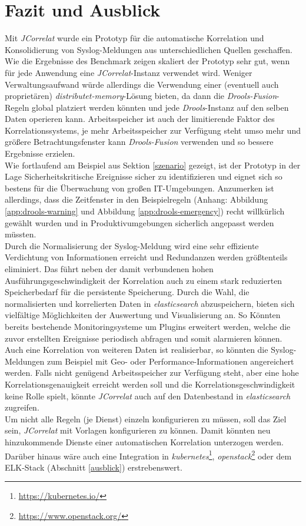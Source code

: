 \chapter{Fazit und Ausblick}
\thispagestyle{fancy}

Mit \textit{JCorrelat} wurde ein Prototyp für die automatische Korrelation und 
Konsolidierung von Syslog-Meldungen aus unterschiedlichen Quellen geschaffen. Wie die 
Ergebnisse des Benchmark zeigen skaliert der Prototyp sehr gut, wenn für jede Anwendung 
eine \textit{JCorrelat}-Instanz verwendet wird. Weniger Verwaltungsaufwand würde 
allerdings die Verwendung einer (eventuell auch proprietären) 
\textit{distributet-memory}-Lösung bieten, da dann die \textit{Drools-Fusion}-Regeln 
global platziert werden könnten und jede \textit{Drools}-Instanz auf den selben Daten 
operieren kann. Arbeitsspeicher ist auch der limitierende Faktor des Korrelationssystems, 
je mehr Arbeitsspeicher zur Verfügung steht umso mehr und größere Betrachtungsfenster 
kann \textit{Drools-Fusion} verwenden und so bessere Ergebnisse erzielen.\\
Wie fortlaufend am Beispiel aus Sektion \ref{szenario} gezeigt, ist der Prototyp in der 
Lage Sicherheitskritische Ereignisse sicher zu identifizieren und eignet sich so bestens 
für die Überwachung von großen IT-Umgebungen. Anzumerken ist allerdings, dass die 
Zeitfenster in den Beispielregeln (Anhang: Abbildung \ref{app:drools-warning} und 
Abbildung \ref{app:drools-emergency}) recht willkürlich gewählt wurden und in 
Produktivumgebungen sicherlich angepasst werden müssten.\\

Durch die Normalisierung der Syslog-Meldung wird eine sehr effiziente Verdichtung von 
Informationen erreicht und Redundanzen werden größtenteils eliminiert. Das führt neben 
der damit verbundenen hohen Ausführungsgeschwindigkeit der Korrelation auch zu einem 
stark reduzierten Speicherbedarf für die persistente Speicherung. Durch die Wahl, die 
normalisierten und korrelierten Daten in \textit{elasticsearch} abzuspeichern, bieten 
sich vielfältige Möglichkeiten der Auswertung und Visualisierung an. So Könnten bereits 
bestehende Monitoringsysteme um Plugins erweitert werden, welche die zuvor erstellten 
Ereignisse periodisch abfragen und somit alarmieren können.\\

Auch eine Korrelation von weiteren Daten ist realisierbar, so könnten die 
Syslog-Meldungen zum Beispiel mit Geo- oder Performance-Informationen angereichert 
werden. Falls nicht genügend Arbeitsspeicher zur Verfügung steht, aber eine hohe 
Korrelationsgenauigkeit erreicht werden soll und die Korrelationsgeschwindigkeit keine 
Rolle spielt, könnte \textit{JCorrelat} auch auf den Datenbestand in 
\textit{elasticsearch} zugreifen.\\
Um nicht alle Regeln (je Dienst) einzeln konfigurieren zu müssen, soll das Ziel sein, 
\textit{JCorrelat} mit Vorlagen konfigurieren zu können. Damit könnten neu hinzukommende 
Dienste einer automatischen Korrelation unterzogen werden. Darüber hinaus wäre auch eine 
Integration in \textit{kubernetes}\footnote{\url{https://kubernetes.io/}}, 
\textit{openstack}\footnote{\url{https://www.openstack.org/}} oder dem ELK-Stack 
(Abschnitt \ref{ausblick}) erstrebenswert. 